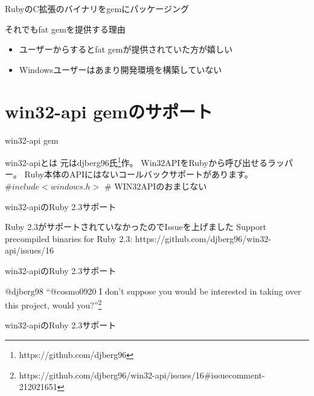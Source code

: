 \documentclass[12pt, unicode]{beamer}
\begin{document}
\begin{frame}{RubyのC拡張のバイナリをgemにパッケージング}
  \begin{block}{それでもfat gemを提供する理由}
    \begin{itemize}
    \item ユーザーからするとfat gemが提供されていた方が嬉しい
    \item Windowsユーザーはあまり開発環境を構築していない
    \end{itemize}
  \end{block}
\end{frame}

\section[]{win32-api gemのサポート}
\begin{frame}{win32-api gem}
  \begin{block}{win32-apiとは}
    元はdjberg96氏\footnote[frame]{https://github.com/djberg96}作。\newline
    Win32APIをRubyから呼び出せるラッパー。\newline
    Ruby本体のAPIにはないコールバックサポートがあります。
    {\bf $\#include <windows.h>$ }\# WIN32APIのおまじない
  \end{block}
\end{frame}

\begin{frame}{win32-apiのRuby 2.3サポート}
  \large{
    \begin{block}{Ruby 2.3がサポートされていなかったのでIssueを上げました}
      Support precompiled binaries for Ruby 2.3: \newline
      https://github.com/djberg96/win32-api/issues/16
    \end{block}
  }
\end{frame}

\begin{frame}{win32-apiのRuby 2.3サポート}
  \Large{
    \begin{block}{}
      @djberg98 ``@cosmo0920 I don't suppose you would be interested in taking over this project, would you?''\footnote[frame]{https://github.com/djberg96/win32-api/issues/16\#issuecomment-212021651}
    \end{block}
  }
\end{frame}

\begin{frame}{win32-apiのRuby 2.3サポート}
  \Large {}
\end{frame}
\end{document}
